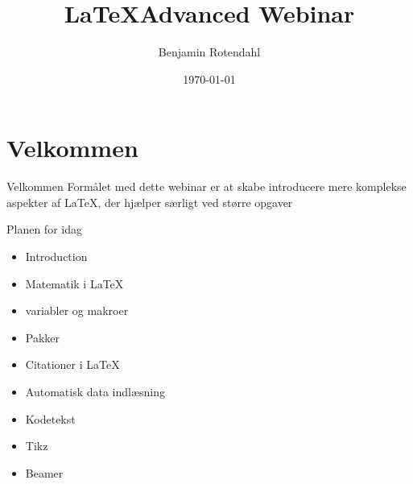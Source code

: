 \documentclass{beamer}
\title{\LaTeX Advanced Webinar}
\date{\today}
\author{Benjamin Rotendahl}
\institute{Study Now}
\begin{document}
\maketitle
\section{Velkommen}

\begin{frame}{Velkommen}
	Formålet med dette webinar er at skabe introducere mere komplekse aspekter af
	\LaTeX, der hjælper særligt ved større opgaver
\end{frame}

\begin{frame}{Planen for idag}
	\begin{itemize}
		\item{Introduction} \pause
		\item{Matematik i \LaTeX} \pause
		\item{variabler og makroer} \pause
		\item{Pakker} \pause
		\item{Citationer i \LaTeX} \pause
		\item{Automatisk data indlæsning} \pause
		\item{Kodetekst} \pause
		\item{Tikz} \pause
		\item{Beamer}
	\end{itemize}
\end{frame}
\end{document}
